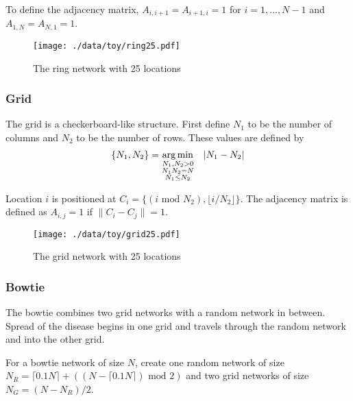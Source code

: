 \documentclass[11pt]{article}
\begin{document}
To define the adjacency matrix, $A_{i,i+1} = A_{i+1,i} = 1$ for $i =
1,\ldots,N-1$ and $A_{1,N} = A_{N,1} = 1$.



\begin{figure}[htb]
\centering
\texttt{[image: ./data/toy/ring25.pdf]}
\caption{\label{fig:ring25}The ring network with 25 locations}
\end{figure}




\subsubsection{Grid}
\label{sec-1-3-4}

The grid is a checkerboard-like structure.  First define $N_1$ to be
the number of columns and $N_2$ to be the number of rows.  These
values are defined by
\begin{equation*}
  \lbrace N_1, N_2 \rbrace = \underset{
    \begin{subarray}{c}
      N_1,N_2 > 0\\
      N_1N_2 = N\\
      N_1 \le N_2
    \end{subarray}
  }{\arg\min} \quad |N_1 - N_2|
\end{equation*}

Location $i$ is positioned at $C_i = \lbrace (i \text{ mod } N_2), \lfloor
i/N_2 \rfloor \rbrace$.  The adjacency matrix is defined as $A_{i,j} =
1$ if $\|C_i - C_j\| = 1$.

\begin{figure}[htb]
\centering
\texttt{[image: ./data/toy/grid25.pdf]}
\caption{\label{fig:grid25}The grid network with 25 locations}
\end{figure}



\subsubsection{Bowtie}
\label{sec-1-3-5}

The bowtie combines two grid networks with a random network in
between.  Spread of the disease begins in one grid and travels through
the random network and into the other grid.

For a bowtie network of size $N$, create one random network of size
$N_R = \lceil 0.1 N \rceil + ((N - \lceil 0.1 N \rceil) \text{ mod }
2)$ and two grid networks of size $N_G = (N - N_R)/2$.
\end{document}
